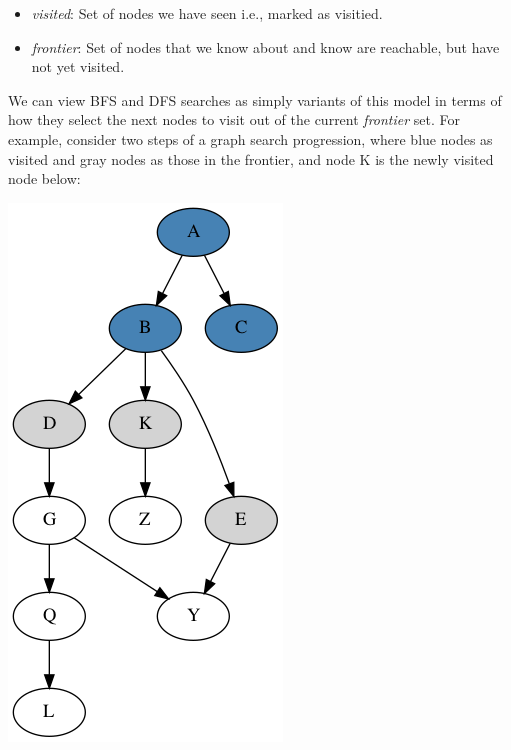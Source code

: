 \documentclass[10pt,a4paper]{article}
\begin{document}
\begin{itemize}
    \item \textit{visited}: Set of nodes we have seen i.e., marked as visitied.
    \item \textit{frontier}: Set of nodes that we know about and know are reachable, but have not yet visited.
\end{itemize}
We can view BFS and DFS searches as simply variants of this model in terms of how they select the next nodes to visit out of the current \textit{frontier} set. For example, consider two steps of a graph search progression, where blue nodes as visited and gray nodes as those in the frontier, and node K is the newly visited node below:
\begin{center}
    \includegraphics[scale=0.25]{diagrams/g3.png}
\end{center}
\end{document}
